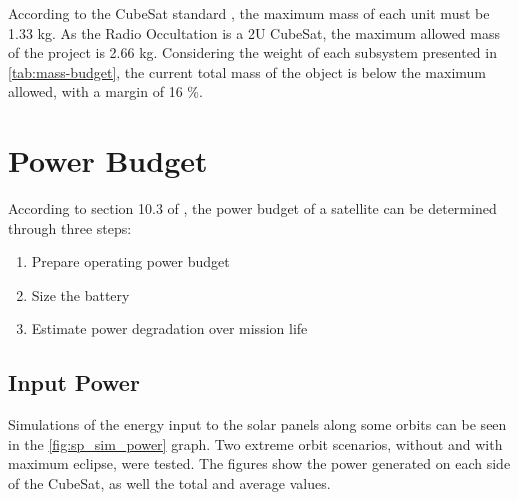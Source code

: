 According to the CubeSat standard \cite{cds}, the maximum mass of each unit must be 1.33 kg. As the Radio Occultation is a 2U CubeSat, the maximum allowed mass of the project is 2.66 kg. Considering the weight of each subsystem presented in \autoref{tab:mass-budget}, the current total mass of the object is below the maximum allowed, with a margin of 16 \%.

\section{Power Budget} \label{power-budget}

According to section 10.3 of \cite{larson2005}, the power budget of a satellite can be determined through three steps:

\begin{enumerate}
    \item Prepare operating power budget
    \item Size the battery
    \item Estimate power degradation over mission life
\end{enumerate}

\subsection{Input Power}

Simulations of the energy input to the solar panels along some orbits can be seen in the \autoref{fig:sp_sim_power} graph. Two extreme orbit scenarios, without and with maximum eclipse, were tested. The figures show the power generated on each side of the CubeSat, as well the total and average values.

